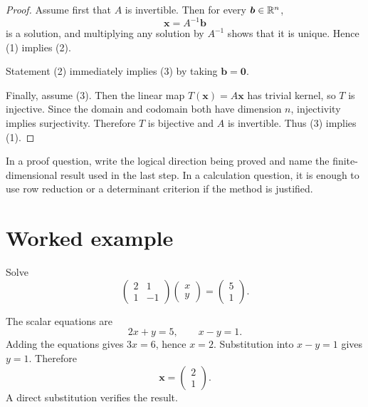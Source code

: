 \begin{proof}
Assume first that $A$ is invertible. Then for every $\bm{b}\in\mathbb{R}^n$,
\[
  \bm{x}=A^{-1}\bm{b}
\]
is a solution, and multiplying any solution by $A^{-1}$ shows that it is unique.
Hence (1) implies (2).

Statement (2) immediately implies (3) by taking $\bm{b}=\bm{0}$.

Finally, assume (3). Then the linear map $T(\bm{x})=A\bm{x}$ has trivial kernel, so
$T$ is injective. Since the domain and codomain both have dimension $n$, injectivity
implies surjectivity. Therefore $T$ is bijective and $A$ is invertible. Thus (3)
implies (1).
\end{proof}

\begin{examnote}
\ExamTag\quad In a proof question, write the logical direction being proved and name
the finite-dimensional result used in the last step. In a calculation question, it is
enough to use row reduction or a determinant criterion if the method is justified.
\end{examnote}

\section{Worked example}

\begin{example}\label{ex:two-by-two}
Solve
\[
  \begin{pmatrix}
    2 & 1\\
    1 & -1
  \end{pmatrix}
  \begin{pmatrix}x\\y\end{pmatrix}
  =
  \begin{pmatrix}5\\1\end{pmatrix}.
\]
\end{example}

\begin{coursesolution}
The scalar equations are
\[
  2x+y=5,
  \qquad
  x-y=1.
\]
Adding the equations gives $3x=6$, hence $x=2$. Substitution into $x-y=1$ gives
$y=1$. Therefore
\[
  \bm{x}=\begin{pmatrix}2\\1\end{pmatrix}.
\]
A direct substitution verifies the result.
\end{coursesolution}

